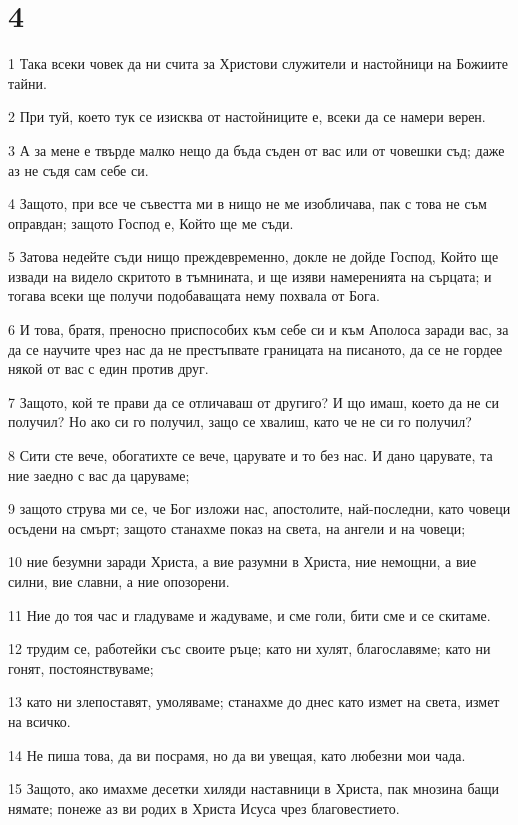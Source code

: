 \chapter{4}

\par 1 Така всеки човек да ни счита за Христови служители и настойници на Божиите тайни.
\par 2 При туй, което тук се изисква от настойниците е, всеки да се намери верен.
\par 3 А за мене е твърде малко нещо да бъда съден от вас или от човешки съд; даже аз не съдя сам себе си.
\par 4 Защото, при все че съвестта ми в нищо не ме изобличава, пак с това не съм оправдан; защото Господ е, Който ще ме съди.
\par 5 Затова недейте съди нищо преждевременно, докле не дойде Господ, Който ще извади на видело скритото в тъмнината, и ще изяви намеренията на сърцата; и тогава всеки ще получи подобаващата нему похвала от Бога.
\par 6 И това, братя, преносно приспособих към себе си и към Аполоса заради вас, за да се научите чрез нас да не престъпвате границата на писаното, да се не гордее някой от вас с един против друг.
\par 7 Защото, кой те прави да се отличаваш от другиго? И що имаш, което да не си получил? Но ако си го получил, защо се хвалиш, като че не си го получил?
\par 8 Сити сте вече, обогатихте се вече, царувате и то без нас. И дано царувате, та ние заедно с вас да царуваме;
\par 9 защото струва ми се, че Бог изложи нас, апостолите, най-последни, като човеци осъдени на смърт; защото станахме показ на света, на ангели и на човеци;
\par 10 ние безумни заради Христа, а вие разумни в Христа, ние немощни, а вие силни, вие славни, а ние опозорени.
\par 11 Ние до тоя час и гладуваме и жадуваме, и сме голи, бити сме и се скитаме.
\par 12 трудим се, работейки със своите ръце; като ни хулят, благославяме; като ни гонят, постоянствуваме;
\par 13 като ни злепоставят, умоляваме; станахме до днес като измет на света, измет на всичко.
\par 14 Не пиша това, да ви посрамя, но да ви увещая, като любезни мои чада.
\par 15 Защото, ако имахме десетки хиляди наставници в Христа, пак мнозина бащи нямате; понеже аз ви родих в Христа Исуса чрез благовестието.
